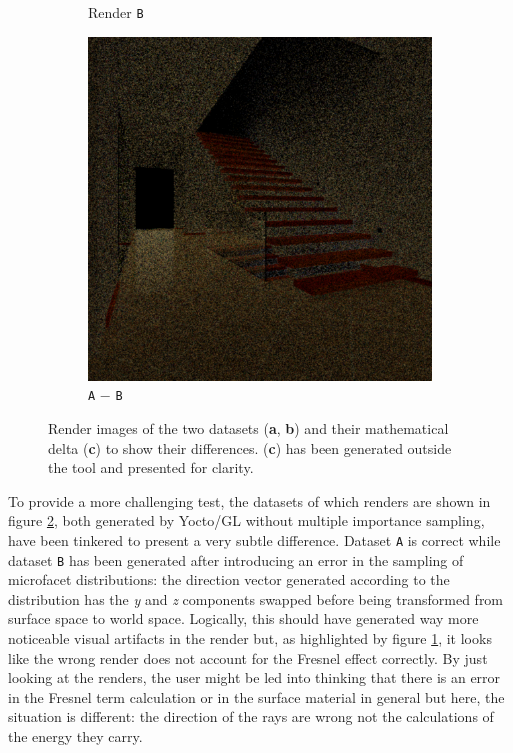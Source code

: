 \begin{figure}
\begin{subfigure}[t]{0.32\linewidth}
		\caption{Render \texttt{B}}
	\end{subfigure}
	\begin{subfigure}[t]{0.32\linewidth}
		\includegraphics[width=\textwidth]{chapters/chapter_results/render2difference}
		\caption{\texttt{A} $-$ \texttt{B}}
		\label{render2difference}
	\end{subfigure}

	\caption{Render images of the two datasets (\textbf{a}, \textbf{b}) and their mathematical delta (\textbf{c}) to show their differences. (\textbf{c}) has been generated outside the tool and presented for clarity.}
	\label{couple2render}
\end{figure}

To provide a more challenging test, the datasets of which renders are shown in figure \ref{couple2render}, both generated by Yocto/GL \cite{pellacini2019yocto} without multiple importance sampling, have been tinkered to present a very subtle difference. Dataset \texttt{A} is correct while dataset \texttt{B} has been generated after introducing an error in the sampling of microfacet distributions: the direction vector generated according to the distribution has the \textit{y} and \textit{z} components swapped before being transformed from surface space to world space. Logically, this should have generated way more noticeable visual artifacts in the render but, as highlighted by figure \ref{render2difference}, it looks like the wrong render does not account for the Fresnel effect correctly. By just looking at the renders, the user might be led into thinking that there is an error in the Fresnel term calculation or in the surface material in general but here, the situation is different: the direction of the rays are wrong not the calculations of the energy they carry.


